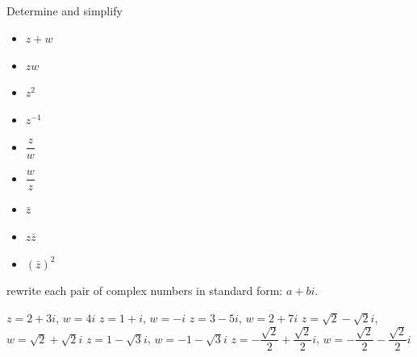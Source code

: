 \subsection*{}

\begin{Exercise}[difficulty = 1] Determine and simplify
	\begin{multicols}{3}	
		\begin{itemize}[labelsep=5mm]	
			\item  $z+w$
			\item  $zw$
			\item  $z^2$	
			\item  $z^{-1}$
			\item  $\dfrac{z}{w}$
			\item  $\dfrac{w}{z}$
			\item  $\bar{z}$
			\item  $z\bar{z}$
			\item  $\left(\bar{z}\right)^2$
		\end{itemize}
	\end{multicols}
rewrite each pair of complex numbers in standard  form: $a+bi$.  
	\begin{multicols}{2}
			\Question  $z = 2+3i$, \quad $w = 4i$
			\Question  $z = 1+i$, \quad $w = -i$
			\Question  $z = 3-5i$, \quad $w = 2+7i$
			\Question  $z = \sqrt{2}-\sqrt{2}i$, \quad $w = \sqrt{2}+\sqrt{2}i$
			\Question  $z = 1-\sqrt{3}i$, \quad $w = -1-\sqrt{3}i$
			\Question  $z = -\dfrac{\sqrt{2}}{2} + \dfrac{\sqrt{2}}{2} i$, \quad $w =  -\dfrac{\sqrt{2}}{2} - \dfrac{\sqrt{2}}{2} i$
		\EndCurrentQuestion
	\end{multicols}
\end{Exercise}

